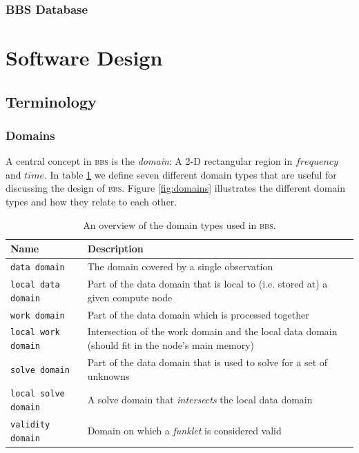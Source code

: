 \documentclass[10pt]{lofar}
\newcommand{\bbs}{\textsc{bbs}\xspace}
\begin{document}
\subsubsection{BBS Database}
\label{subsubsec:interf-database}

\cleardoublepage

\section{Software Design}
\label{sec:software-design}

\subsection{Terminology}
\label{subsec:terminology}

\subsubsection{Domains}
\label{subsubsec:domains}
A central concept in \bbs is the \emph{domain}: A 2-D rectangular region in
$frequency$ and $time$. In table \ref{tab:domains} we define seven different
domain types that are useful for discussing the design of \bbs. Figure
\ref{fig:domains} illustrates the different domain types and how they relate to
each other.

\begin{table}[htb!]
\centering
\begin{tabular}{lp{}}
\hline
\textbf{Name} & \textbf{Description}\\
\hline
\texttt{data domain} & The domain covered by a single observation\\
\hline
\texttt{local data domain} & Part of the data domain that is local to (i.e.
stored at) a given compute node\\
\hline
\texttt{work domain} & Part of the data domain which is processed together\\
\hline
\texttt{local work domain} & Intersection of the work domain and the local data
domain (should fit in the node's main memory)\\
\hline
\texttt{solve domain} & Part of the data domain that is used to solve for a set
of unknowns\\
\hline
\texttt{local solve domain} & A solve domain that \emph{intersects} the local
data domain\\
\hline
\texttt{validity domain} & Domain on which a \emph{funklet} is considered
valid\\
\end{tabular}
\caption{An overview of the domain types used in \bbs.}
\label{tab:domains}
\end{table}
\end{document}
